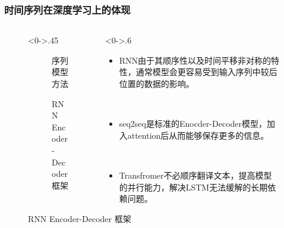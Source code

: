 \documentclass[10pt,t,handout]{beamer}
\begin{document}
\begin{frame}
\frametitle{时间序列在深度学习上的体现} 
\begin{figure}
	\begin{columns}[T] %
		\begin{column}<0->{.45\textwidth}
			\begin{figure}[thpb]
				\centering
				\caption{序列模型方法}
				\label{fig:camps}
			\end{figure}
			\begin{figure}[thpb]
			\centering
			\caption{RNN Encoder-Decoder 框架}
			\label{fig:mps}
		\end{figure}
		\end{column}%
		\hfill%
		\begin{column}<0->{.6\textwidth}
			\begin{itemize}
				\item<1-> RNN由于其顺序性以及时间平移非对称的特性，通常模型会更容易受到输入序列中较后位置的数据的影响。
				
				\
				
				\item<2->  seq2seq是标准的Enocder-Decoder模型，加入attention后从而能够保存更多的信息。
				
				\
				
				\item<3-> Transfromer不必顺序翻译文本，提高模型的并行能力，解决LSTM无法缓解的长期依赖问题。
			 
			\end{itemize}
		\end{column}%
	\end{columns}
\end{figure}
\end{frame}
\end{document}
